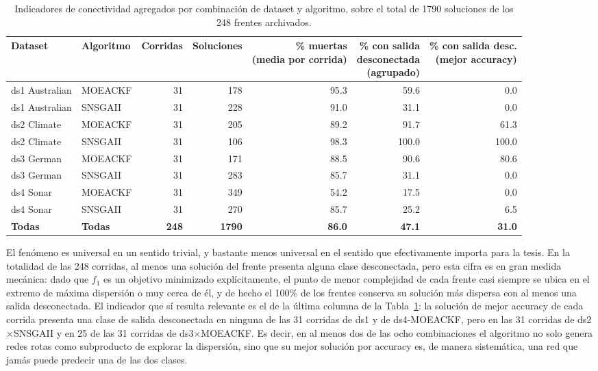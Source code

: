 \begin{table}[htbp]
\centering
\small
\footnotesize
\caption{Indicadores de conectividad agregados por combinación de dataset y algoritmo,
sobre el total de 1790 soluciones de los 248 frentes archivados.}
\label{tab:conectividad-resumen}
\begin{tabular}{llrrrrr}
\toprule
Dataset & Algoritmo & Corridas & Soluciones &
\shortstack{\% muertas\\(media por corrida)} &
\shortstack{\% con salida\\desconectada\\(agrupado)} &
\shortstack{\% con salida desc.\\(mejor accuracy)} \\
\midrule
ds1 Australian & MOEACKF & 31 & 178 & 95.3 & 59.6 & 0.0 \\
ds1 Australian & SNSGAII & 31 & 228 & 91.0 & 31.1 & 0.0 \\
ds2 Climate    & MOEACKF & 31 & 205 & 89.2 & 91.7 & 61.3 \\
ds2 Climate    & SNSGAII & 31 & 106 & 98.3 & 100.0 & 100.0 \\
ds3 German     & MOEACKF & 31 & 171 & 88.5 & 90.6 & 80.6 \\
ds3 German     & SNSGAII & 31 & 283 & 85.7 & 31.1 & 0.0 \\
ds4 Sonar      & MOEACKF & 31 & 349 & 54.2 & 17.5 & 0.0 \\
ds4 Sonar      & SNSGAII & 31 & 270 & 85.7 & 25.2 & 6.5 \\
\midrule
\textbf{Todas} & \textbf{Todas} & \textbf{248} & \textbf{1790} & \textbf{86.0} & \textbf{47.1} & \textbf{31.0} \\
\bottomrule
\end{tabular}
\end{table}

El fenómeno es universal en un sentido trivial, y bastante menos universal en el sentido que efectivamente importa para la tesis. En la totalidad de las 248 corridas, al menos una solución del frente presenta alguna clase desconectada, pero esta cifra es en gran medida mecánica: dado que $f_1$ es un objetivo minimizado explícitamente, el punto de menor complejidad de cada frente casi siempre se ubica en el extremo de máxima dispersión o muy cerca de él, y de hecho el 100\% de los frentes conserva su solución más dispersa con al menos una salida desconectada. El indicador que sí resulta relevante es el de la última columna de la Tabla~\ref{tab:conectividad-resumen}: la solución de mejor accuracy de cada corrida presenta una clase de salida desconectada en ninguna de las 31 corridas de ds1 y de ds4-MOEACKF, pero en las 31 corridas de ds2$\times$SNSGAII y en 25 de las 31 corridas de ds3$\times$MOEACKF. Es decir, en al menos dos de las ocho combinaciones el algoritmo no solo genera redes rotas como subproducto de explorar la dispersión, sino que su mejor solución por accuracy es, de manera sistemática, una red que jamás puede predecir una de las dos clases.

